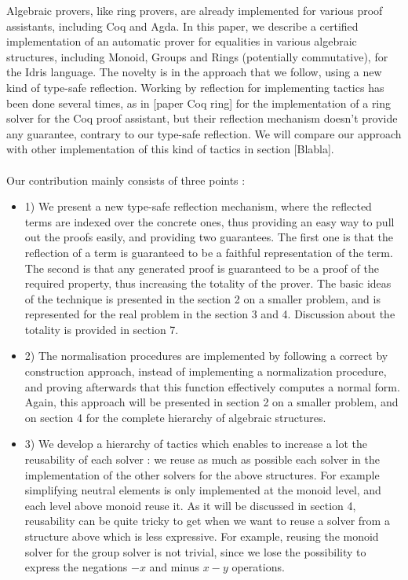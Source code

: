 Algebraic provers, like ring provers, are already implemented for various proof assistants, including Coq and Agda. In this paper, we describe a certified implementation of an automatic prover for equalities in various algebraic structures, including Monoid, Groups and Rings (potentially commutative), for the Idris language. The novelty is in the approach that we follow, using a new kind of type-safe reflection.
Working by reflection for implementing tactics has been done several times, as in [paper Coq ring] for the implementation of a ring solver for the Coq proof assistant, but their reflection mechanism  doesn't provide any guarantee, contrary to our type-safe reflection. We will compare our approach with other implementation of this kind of tactics in section [Blabla]. \\
\\
Our contribution mainly consists of three points :
\begin{itemize}
	\item 1) We present a new type-safe reflection mechanism, where the reflected terms are indexed over the concrete ones, thus providing an easy way to pull out the proofs easily, and providing two guarantees. The first one is that the reflection of a term is guaranteed to be a faithful representation of the term. The second is that any generated proof is guaranteed to be a proof of the required property, thus increasing the totality of the prover. The basic ideas of the technique is presented in the section 2 on a smaller problem, and is represented for the real problem in the section 3 and 4. Discussion about the totality is provided in section 7.	
	\item 2) The normalisation procedures are implemented by following a correct by construction approach, instead of implementing a normalization procedure, and proving afterwards that this function effectively computes a normal form. Again, this approach will be presented in section 2 on a smaller problem, and on section 4 for the complete hierarchy of algebraic structures.
	\item 3) We develop a hierarchy of tactics which enables to increase a lot the reusability of each solver : we reuse as much as possible each solver in the implementation of the other solvers for the above structures. For example simplifying neutral elements is only implemented at the monoid level, and each level above monoid reuse it. As it will be discussed in section 4, reusability can be quite tricky to get when we want to reuse a solver from a structure above which is less expressive. For example, reusing the monoid solver for the group solver is not trivial, since we lose the possibility to express the negations $-x$ and minus $x-y$ operations.
\end{itemize}